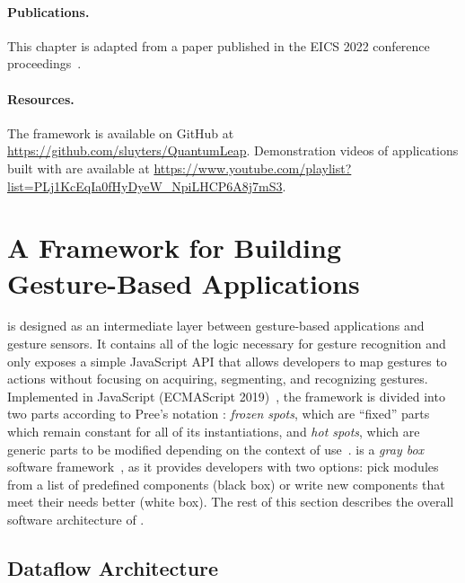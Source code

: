 \paragraph{Publications.} This chapter is adapted from a paper published in the EICS 2022 conference proceedings~\cite{Sluyters:2022:EICS}.

\paragraph{Resources.} The \ql framework is available on GitHub at \url{https://github.com/sluyters/QuantumLeap}. Demonstration videos of applications built with \ql are available at \url{https://www.youtube.com/playlist?list=PLj1KcEqIa0fHyDyeW_NpiLHCP6A8j7mS3}.


\section{A Framework for Building Gesture-Based Applications} \label{sec:quantumleap:description}

\ql is designed as an intermediate layer between gesture-based applications and gesture sensors. It contains all of the logic necessary for gesture recognition and only exposes a simple JavaScript API that allows developers to map gestures to actions without focusing on acquiring, segmenting, and recognizing gestures. 
Implemented in JavaScript (ECMAScript 2019)~\cite{Ecma:2017}, the \ql framework is divided into two parts according to Pree's notation \cite{Pree:1994}: \textit{frozen spots}, which are ``fixed'' parts which remain constant for all of its instantiations, and \textit{hot spots}, which are generic parts to be modified depending on the context of use~\cite{Calvary:2003}.
\ql is a \textit{gray box} software framework~\cite{Parsons:1999}, as it provides developers with two options: pick modules from a list of predefined components (black box) or write new components that meet their needs better (white box).
The rest of this section describes the overall software architecture of \ql.

\subsection{Dataflow Architecture} \label{sec:quantumleap:description:architecture}

